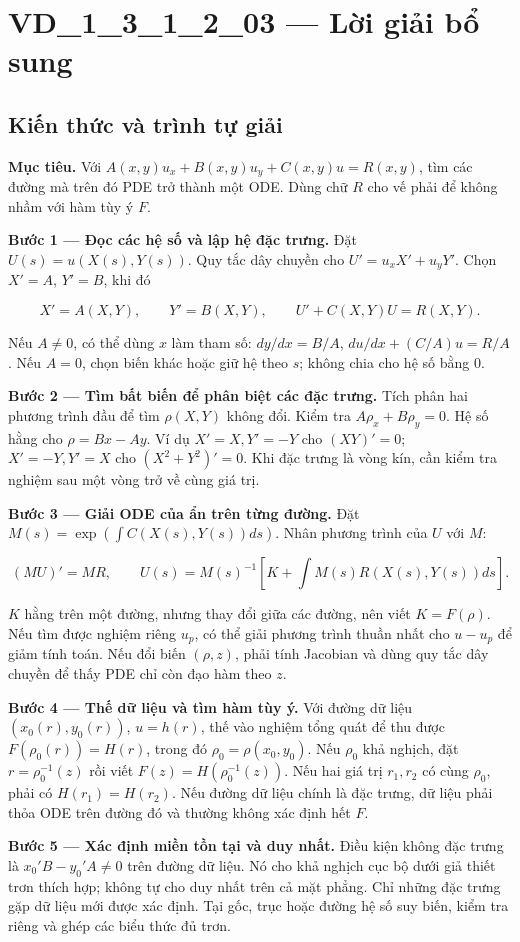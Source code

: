 \documentclass[10pt,a4paper]{article}
\begin{document}
\section*{VD\_1\_3\_1\_2\_03 — Lời giải bổ sung}
\subsection*{Kiến thức và trình tự giải}
\textbf{Mục tiêu.} Với $A(x,y)u_x+B(x,y)u_y+C(x,y)u=R(x,y)$, tìm các đường mà trên đó PDE trở thành một ODE. Dùng chữ $R$ cho vế phải để không nhầm với hàm tùy ý $F$.

\textbf{Bước 1 — Đọc các hệ số và lập hệ đặc trưng.} Đặt $U(s)=u(X(s),Y(s))$. Quy tắc dây chuyền cho $U'=u_xX'+u_yY'$. Chọn $X'=A$, $Y'=B$, khi đó

\[
X'=A(X,Y),\qquad Y'=B(X,Y),\qquad U'+C(X,Y)U=R(X,Y).
\]

Nếu $A\ne0$, có thể dùng $x$ làm tham số: $dy/dx=B/A$, $du/dx+(C/A)u=R/A$. Nếu $A=0$, chọn biến khác hoặc giữ hệ theo $s$; không chia cho hệ số bằng 0.

\textbf{Bước 2 — Tìm bất biến để phân biệt các đặc trưng.} Tích phân hai phương trình đầu để tìm $\rho(X,Y)$ không đổi. Kiểm tra $A\rho_x+B\rho_y=0$. Hệ số hằng cho $\rho=Bx-Ay$. Ví dụ $X'=X,Y'=-Y$ cho $(XY)'=0$; $X'=-Y,Y'=X$ cho $(X^2+Y^2)'=0$. Khi đặc trưng là vòng kín, cần kiểm tra nghiệm sau một vòng trở về cùng giá trị.

\textbf{Bước 3 — Giải ODE của ẩn trên từng đường.} Đặt $M(s)=\exp(\int C(X(s),Y(s))ds)$. Nhân phương trình của $U$ với $M$:

\[
(MU)'=MR,\qquad
U(s)=M(s)^{-1}\left[K+\int M(s)R(X(s),Y(s))ds\right].
\]

$K$ hằng trên một đường, nhưng thay đổi giữa các đường, nên viết $K=F(\rho)$. Nếu tìm được nghiệm riêng $u_p$, có thể giải phương trình thuần nhất cho $u-u_p$ để giảm tính toán. Nếu đổi biến $(\rho,z)$, phải tính Jacobian và dùng quy tắc dây chuyền để thấy PDE chỉ còn đạo hàm theo $z$.

\textbf{Bước 4 — Thế dữ liệu và tìm hàm tùy ý.} Với đường dữ liệu $(x_0(r),y_0(r))$, $u=h(r)$, thế vào nghiệm tổng quát để thu được $F(\rho_0(r))=H(r)$, trong đó $\rho_0=\rho(x_0,y_0)$. Nếu $\rho_0$ khả nghịch, đặt $r=\rho_0^{-1}(z)$ rồi viết $F(z)=H(\rho_0^{-1}(z))$. Nếu hai giá trị $r_1,r_2$ có cùng $\rho_0$, phải có $H(r_1)=H(r_2)$. Nếu đường dữ liệu chính là đặc trưng, dữ liệu phải thỏa ODE trên đường đó và thường không xác định hết $F$.

\textbf{Bước 5 — Xác định miền tồn tại và duy nhất.} Điều kiện không đặc trưng là $x_0'B-y_0'A\ne0$ trên đường dữ liệu. Nó cho khả nghịch cục bộ dưới giả thiết trơn thích hợp; không tự cho duy nhất trên cả mặt phẳng. Chỉ những đặc trưng gặp dữ liệu mới được xác định. Tại gốc, trục hoặc đường hệ số suy biến, kiểm tra riêng và ghép các biểu thức đủ trơn.
\end{document}
